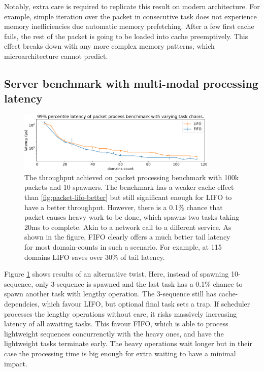 \documentclass[12pt,a4paper,twoside]{report}
\begin{document}
Notably, extra care is required to replicate this result on modern architecture. For example, simple iteration over the packet in consecutive task does not experience memory inefficiencies due automatic memory prefetching. After a few first cache fails, the rest of the packet is going to be loaded into cache preemptively. This effect breaks down with any more complex memory patterns, which microarchitecture cannot predict.   

\subsection{Server benchmark with multi-modal processing latency}
\label{section:server-bench-with-multi-modal}

\begin{figure} 
    \centering 
    \includegraphics[width=0.85\textwidth]{eval/packet-basic-fifo-better.png}
    \caption{The throughput achieved on packet processing benchmark with 100k packets and 10 spawners. The benchmark has a weaker cache effect than \ref{fig:packet-lifo-better} but still significant enough for LIFO to have a better throughput. However, there is a 0.1\% chance that packet causes heavy work to be done, which spawns two tasks taking 20ms to complete. Akin to a network call to a different service. As shown in the figure, FIFO clearly offers a much better tail latency for most domain-counts in such a scenario. For example, at 115 domains LIFO saves over 30\% of tail latency.}
   \label{fig:packet-fifo-better}
\end{figure}

Figure \ref{fig:packet-fifo-better} shows results of an alternative twist. Here, instead of spawning 10-sequence, only 3-sequence is spawned and the last task has a 0.1\% chance to spawn another task with lengthy operation. The 3-sequence still has cache-dependcies, which favour LIFO, but optional final task sets a trap. If scheduler processes the lengthy operations without care, it risks massively increasing latency of all awaiting tasks. This favour FIFO, which is able to process lightweight sequences concurrenctly with the heavy ones, and have the lightweight tasks terminate early. The heavy operations wait longer but in their case the processing time is big enough for extra waiting to have a minimal impact. 
\end{document}
